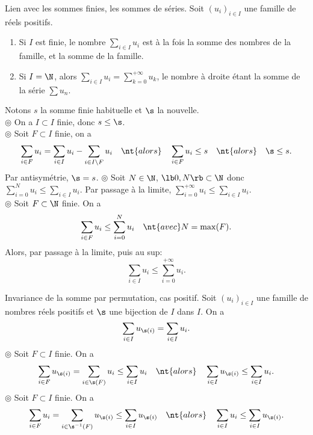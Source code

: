 \documentclass[11pt]{article}
\begin{document}
\begin{prop}{Lien avec les sommes finies, les sommes de séries.}{}
    Soit $(u_i)_{i\in I}$ une famille de réels positifs.
    \begin{enumerate}[itemsep=-0.9 ex]
        \item Si $I$ est finie, le nombre $\sum\limits_{i\in I}u_i$ est à la fois la somme des nombres de la famille, et la somme de la famille.
        \item Si $I=\N$, alors $\sum\limits_{i\in I}u_i=\sum\limits_{k=0}^{+\infty}u_k$, le nombre à droite étant la somme de la série $\sum u_n$.
    \end{enumerate}
    \tcblower
     Notons $s$ la somme finie habituelle et $\s$ la nouvelle.\\
    $\circledcirc$ On a $I\subset I$ finie, donc $s\leq \s$.\\
    $\circledcirc$ Soit $F\subset I$ finie, on a
    \begin{equation*}
        \sum_{i\in F}u_i=\sum_{i\in I} u_i - \sum_{i\in I\setminus F}u_i\quad\nt{alors}\quad\sum_{i\in F}u_i\leq s\quad\nt{alors}\quad\s\leq s.
    \end{equation*}
    Par antisymétrie, $\s=s$.\n
    $\circledcirc$ Soit $N\in\N$, $\lb0,N\rb\subset\N$ donc \large$\sum\limits_{i=0}^Nu_i\leq\sum\limits_{i\in I}u_i$. \normalsize Par passage à la limite, \large$\sum\limits_{i=0}^{+\infty}u_i\leq\sum\limits_{i\in I}u_i$.\normalsize\\
    $\circledcirc$ Soit $F\subset\N$ finie. On a
    \begin{equation*}
        \sum_{i\in F}u_i \leq \sum_{i=0}^Nu_i\quad\nt{avec }N=\max(F).
    \end{equation*}
    Alors, par passage à la limite, puis au sup:
    \begin{equation*}
        \sum_{i\in I}u_i\leq\sum_{i=0}^{+\infty}u_i.
    \end{equation*}
\end{prop}

\begin{prop}{Invariance de la somme par permutation, cas positif.}{}
    Soit $(u_i)_{i\in I}$ une famille de nombres réels positifs et $\s$ une bijection de $I$ dans $I$. On a
    \begin{equation*}
        \sum_{i\in I}u_{\s(i)}=\sum_{i\in I}u_i.
    \end{equation*}
    \tcblower
    $\circledcirc$ Soit $F\subset I$ finie. On a
    \begin{equation*}
        \sum_{i\in F}u_{\s(i)}=\sum_{i\in\s(F)}u_i\leq\sum_{i\in I}u_i\quad\nt{alors}\quad\sum_{i\in I}u_{\s(i)}\leq\sum_{i\in I}u_i.
    \end{equation*}
    $\circledcirc$ Soit $F\subset I$ finie. On a
    \begin{equation*}
        \sum_{i\in F}u_i = \sum_{i\in\s^{-1}(F)}u_{\s(i)}\leq\sum_{i\in I}u_{\s(i)}\quad\nt{alors}\quad\sum_{i\in I}u_i\leq \sum_{i\in I}u_{\s(i)}.
    \end{equation*}
\end{prop}
\end{document}
